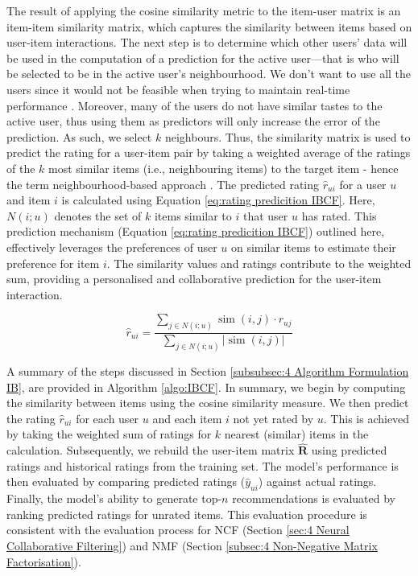 The result of applying the cosine similarity metric to the item-user matrix is an item-item similarity matrix, which captures the similarity between items based on user-item interactions. The next step is to determine which other users’ data will be used in the computation of a prediction for the active user—that is who will be selected to be in the active user’s neighbourhood. We don’t want to use all the users since it would not be feasible when trying to maintain real-time performance \cite{herlocker2002empirical}. Moreover, many of the users do not have similar tastes to the active user, thus using them as predictors will only increase the error of the prediction. As such, we select $k$ neighbours. Thus, the similarity matrix is used to predict the rating for a user-item pair by taking a weighted average of the ratings of the $k$ most similar items (i.e., neighbouring items) to the target item - hence the term neighbourhood-based approach \cite{linden2001collaborative}. The predicted rating $\hat{r}_{u i}$ for a user $u$ and item $i$ is calculated using Equation \ref{eq:rating predicition IBCF}. Here, $N(i ; u)$ denotes the set of $k$ items similar to $i$ that user $u$ has rated. This prediction mechanism (Equation \ref{eq:rating predicition IBCF}) outlined here, effectively leverages the preferences of user $u$ on similar items to estimate their preference for item $i$. The similarity values and ratings contribute to the weighted sum, providing a personalised and collaborative prediction for the user-item interaction.


\begin{equation}
\hat{r}_{u i} = \frac{\sum_{j \in N(i ; u)} \operatorname{sim}(i, j) \cdot r_{u j}}{\sum_{j \in N(i ; u)}|\operatorname{sim}(i, j)|}
\label{eq:rating predicition IBCF}
\end{equation}

A summary of the steps discussed in Section \ref{subsubsec:4 Algorithm Formulation IB}, are provided in Algorithm \ref{algo:IBCF}. In summary, we begin by computing the similarity between items using the cosine similarity measure. We then predict the rating $\hat{r}_{u i}$ for each user $u$ and each item $i$ not yet rated by $u$. This is achieved by taking the weighted sum of ratings for $k$ nearest (similar) items in the calculation. Subsequently, we rebuild the user-item matrix $\hat{\mathbf{R}}$ using predicted ratings and historical ratings from the training set. The model's performance is then evaluated by comparing predicted ratings ($\hat{y}_{u i}$) against actual ratings. Finally, the model's ability to generate top-$n$ recommendations is evaluated by ranking predicted ratings for unrated items. This evaluation procedure is consistent with the evaluation process for NCF (Section \ref{sec:4 Neural Collaborative Filtering}) and NMF (Section \ref{subsec:4 Non-Negative Matrix Factorisation}).

